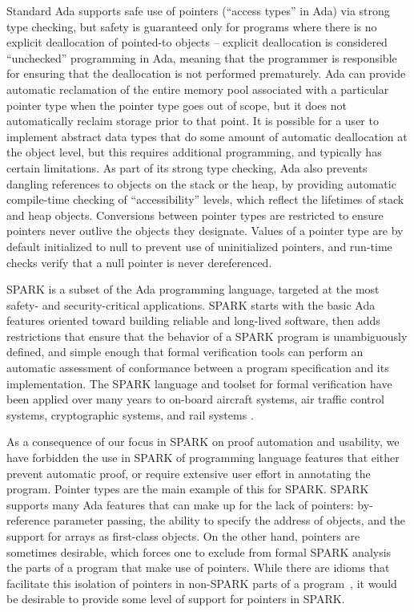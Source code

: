 \documentclass[runningheads]{llncs}
\begin{document}
Standard Ada supports safe use of pointers (``access types'' in Ada) via strong type checking, but safety is guaranteed only for programs where there is no explicit deallocation of pointed-to objects -- explicit deallocation is considered ``unchecked'' programming in Ada, meaning that the programmer is responsible for ensuring that the deallocation is not performed prematurely. Ada can provide automatic reclamation of the entire memory pool associated with a particular pointer type when the pointer type goes out of scope, but it does not automatically reclaim storage prior to that point. It is possible for a user to implement abstract data types that do some amount of automatic deallocation at the object level, but this requires additional programming, and typically has certain limitations. As part of its strong type checking, Ada also prevents dangling references to objects on the stack or the heap, by providing automatic compile-time checking of ``accessibility'' levels, which reflect the lifetimes of stack and heap objects.  Conversions between pointer types are restricted to ensure pointers never outlive the objects they designate. Values of a pointer type are by default initialized to null to prevent use of uninitialized pointers, and run-time checks verify that a null pointer is never dereferenced.


SPARK is a subset of the Ada programming language, targeted at the most safety- and security-critical applications. SPARK starts with the basic Ada features oriented toward building reliable and long-lived software, then adds restrictions that ensure that the behavior of a SPARK program is unambiguously defined, and simple enough that formal verification tools can perform an automatic assessment of conformance between a program specification and its implementation. The SPARK language and toolset for formal verification have been applied over many years to on-board aircraft systems,
air traffic control systems, cryptographic systems, and rail systems \cite{ONeill2012,McCormick2015}.

As a consequence of our focus in SPARK on proof automation and usability, we have forbidden the use in SPARK of programming language features that either prevent automatic proof, or require extensive user effort in annotating the program. Pointer types are the main example of this for SPARK. SPARK supports many Ada features that can make up for the lack of pointers: by-reference parameter passing, the ability to specify the address of objects, and the support for arrays as first-class objects. On the other hand, pointers are sometimes desirable, which forces one to exclude from formal SPARK analysis the parts of a program that make use of pointers. While there are idioms that facilitate this isolation of pointers in non-SPARK parts of a program~\cite{AdaCoreThalesSPARK}, it would be desirable to provide some level of support for pointers in SPARK.
\end{document}
